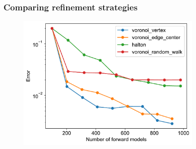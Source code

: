 \documentclass{beamer}
\begin{document}
    \begin{frame}
        \frametitle{Comparing refinement strategies}
        \begin{figure}
            \includegraphics[width=0.8\textwidth]{figs/refinements.pdf}
        \end{figure}
    \end{frame}
\end{document}
